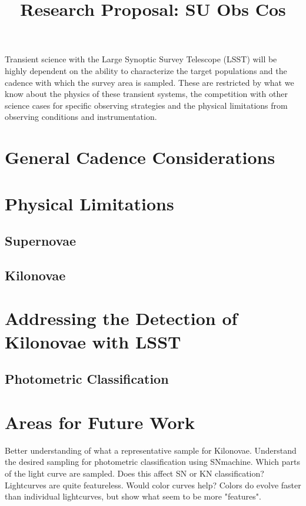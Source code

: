 \documentclass[11pt]{article}
\title{Research Proposal: SU Obs Cos}
\begin{document}
\par
\vspace{7pt}
Transient science with the Large Synoptic Survey Telescope (LSST) will be highly dependent on the ability to characterize the target populations and the cadence with which the survey area is sampled. These are restricted by what we know about the physics of these transient systems, the competition with other science cases for specific observing strategies and the physical limitations from observing conditions and instrumentation. 
\section{General Cadence Considerations}

\section{Physical Limitations}


\subsection{Supernovae}

\subsection{Kilonovae}

\section{Addressing the Detection of Kilonovae with LSST}

\subsection{Photometric Classification}

\section{Areas for Future Work}
Better understanding of what a representative sample for Kilonovae. 
Understand the desired sampling for photometric classification using SNmachine. Which parts of the light curve are sampled. Does this affect SN or KN classification?
Lightcurves are quite featureless. Would color curves help? Colors do evolve faster than individual lightcurves, but show what seem to be more "features". 
\end{document}
